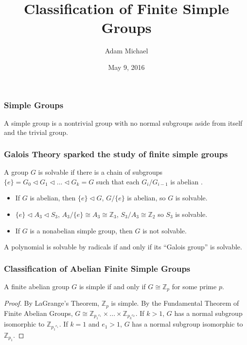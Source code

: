 \documentclass{beamer}
\title[]
{Classification of Finite Simple Groups}
\author
{Adam Michael}
\institute[Rose-Hulman]
{
	MA376 - Abstract Algebra\\
	Department of Mathematics\\
	Rose-Hulman Institute of Technology
}
\date[May 9, 2016]
{May 9, 2016}
\begin{document}
\frame{\titlepage}

\begin{frame}
	\frametitle{Simple Groups}
	\begin{definition}
	A simple group is a nontrivial group with no normal subgroups aside from itself and the trivial group.
	\end{definition}
\end{frame}

\begin{frame}
	\frametitle{Galois Theory sparked the study of finite simple groups} 
	\begin{definition}
	A group $G$ is solvable if there is a chain of subgroups $\{e\} = G_0 \triangleleft G_1 \triangleleft ... \triangleleft G_k = G$ such that each $G_i / G_{i-1}$ is abelian \cite{gallian}.
	\end{definition}
	\begin{examples}
	\begin{itemize}
		\item
		If $G$ is abelian, then $\{e\} \triangleleft G$, $G/\{e\}$ is abelian, so $G$ is solvable.
		\item
		$\{e\} \triangleleft A_3 \triangleleft S_3$, $A_3/ \{e\} \cong A_3 \cong \mathbb{Z}_3$, $S_3/A_3 \cong \mathbb{Z}_2$ so $S_3$ is solvable.
		\item
		If $G$ is a nonabelian simple group, then $G$ is not solvable.
	\end{itemize}
	\end{examples}
	\begin{theorem}
	A polynomial is solvable by radicals if and only if its ``Galois group'' is solvable.
	\end{theorem}
\end{frame}

\begin{frame}
	\frametitle{Classification of Abelian Finite Simple Groups}
	\begin{theorem}
	A finite abelian group $G$ is simple if and only if $G \cong \mathbb{Z}_p$ for some prime $p$.
	\end{theorem}
	\begin{proof}
	By LaGrange's Theorem, $\mathbb{Z}_p$ is simple. By the Fundamental Theorem of Finite Abelian Groups, $G \cong \mathbb{Z}_{{p_1}^{e_1}} \times ... \times \mathbb{Z}_{{p_k}^{e_k}}$. If $k > 1$, $G$ has a normal subgroup isomorphic to $\mathbb{Z}_{{p_1}^{e_1}}$. If $k = 1$ and $e_1 > 1$, $G$ has a normal subgroup isomorphic to $\mathbb{Z}_{{p_1}}$.
	\end{proof}
\end{frame}
\end{document}
